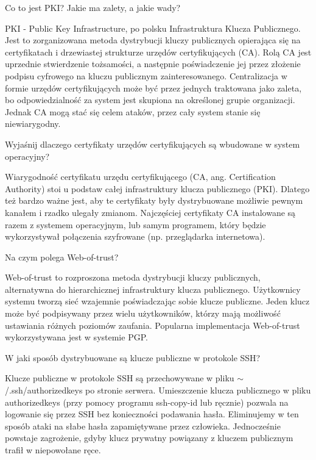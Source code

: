 \documentclass[answers,11pt]{exam}
\begin{document}
\begin{questions}

\question Co to jest PKI? Jakie ma zalety, a jakie wady?
\begin{solution}
PKI - Public Key Infrastructure, po polsku Infrastruktura Klucza Publicznego. Jest to zorganizowana metoda dystrybucji kluczy publicznych opierająca się na certyfikatach i drzewiastej strukturze urzędów certyfikujących (CA). Rolą CA jest uprzednie stwierdzenie tożsamości, a następnie poświadczenie jej przez złożenie podpisu cyfrowego na kluczu publicznym zainteresowanego. Centralizacja w formie urzędów certyfikujących może być przez jednych traktowana jako zaleta, bo odpowiedzialność za system jest skupiona na określonej grupie organizacji. Jednak CA mogą stać się celem ataków, przez cały system stanie się niewiarygodny.
\end{solution}

\question Wyjaśnij dlaczego certyfikaty urzędów certyfikujących są wbudowane w system operacyjny?
\begin{solution}
Wiarygodność certyfikatu urzędu certyfikującego (CA, ang. Certification Authority) stoi u podstaw całej infrastruktury klucza publicznego (PKI). Dlatego też bardzo ważne jest, aby te certyfikaty były dystrybuowane możliwie pewnym kanałem i rzadko ulegały zmianom. Najczęściej certyfikaty CA instalowane są razem z systemem operacyjnym, lub samym programem, który będzie wykorzystywał połączenia szyfrowane (np. przeglądarka internetowa).
\end{solution}

\question Na czym polega Web-of-trust?
\begin{solution}
Web-of-trust to rozproszona metoda dystrybucji kluczy publicznych, alternatywna do hierarchicznej infrastruktury klucza publicznego. Użytkownicy systemu tworzą sieć wzajemnie poświadczając sobie klucze publiczne. Jeden klucz może być podpisywany przez wielu użytkowników, którzy mają możliwość ustawiania różnych poziomów zaufania. Popularna implementacja Web-of-trust wykorzystywana jest w systemie PGP.
\end{solution}

\question W jaki sposób dystrybuowane są klucze publiczne w protokole SSH?
\begin{solution}
Klucze publiczne w protokole SSH są przechowywane w pliku $\sim$/.ssh/authorized\textunderscore keys po stronie serwera.
Umieszczenie klucza publicznego w pliku authorized\textunderscore keys (przy pomocy programu ssh-copy-id lub ręcznie) pozwala na logowanie się przez SSH bez konieczności podawania hasła. Eliminujemy w ten sposób ataki na słabe hasła zapamiętywane przez człowieka. Jednocześnie powstaje zagrożenie, gdyby klucz prywatny powiązany z kluczem publicznym trafił w niepowołane ręce.
\end{solution}


\end{questions}
\end{document}
